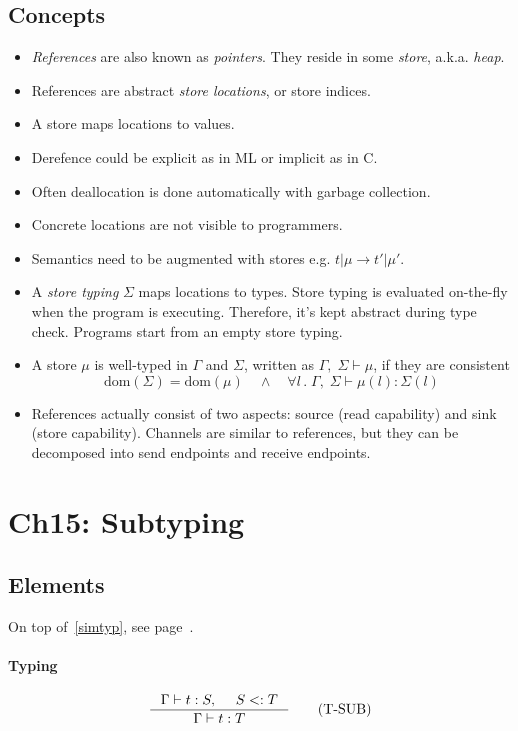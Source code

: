 \documentclass{article}
\newcommand{\typjud}[2]{\Gamma \vdash #1: #2}
\newcommand{\typjudr}[2]{\Gamma,\; \Sigma \vdash #1: #2}
\newcommand{\dom}{\mathrm{dom}}
\begin{document}
\subsection{Concepts}
  \begin{itemize}
    \item \emph{References} are also known as \emph{pointers}.
      They reside in some \emph{store}, a.k.a. \emph{heap}.
    \item References are abstract \emph{store locations}, or store indices.
    \item A store maps locations to values.
    \item Derefence could be explicit as in ML or implicit as in C.
    \item Often deallocation is done automatically with garbage collection.
    \item Concrete locations are not visible to programmers.
    \item Semantics need to be augmented with stores e.g. $t | \mu \to t' | \mu'$.
    \item A \emph{store typing} $\Sigma$ maps locations to types.
      Store typing is evaluated on-the-fly when the program is executing.
      Therefore, it's kept abstract during type check.
      Programs start from an empty store typing.
    \item A store $\mu$ is well-typed in $\Gamma$ and $\Sigma$, written as $\Gamma, \;\Sigma\vdash \mu$, if they are consistent
      \[ \dom(\Sigma) = \dom(\mu)  \quad\land\quad  \forall l\, .\; \typjudr{\mu(l)}{\Sigma(l)}\]
    \item References actually consist of two aspects: source (read capability) and sink (store capability).
      Channels are similar to references, but they can be decomposed into send endpoints and receive endpoints.
  \end{itemize}



\section{Ch15: Subtyping}
\subsection{Elements}
  On top of~\ref{simtyp}, see page~\pageref{simtyp}.

\paragraph{Typing}
  \begin{align*}
    & \inference
      {\typjud{t}{S},& S <: T}
      {\typjud{t}{T}}
      \tag{T-SUB}\\
  \end{align*}
\end{document}
